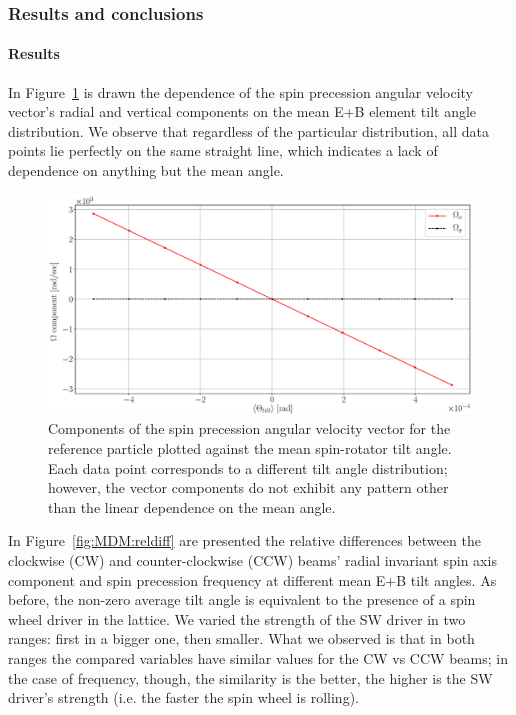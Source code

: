 \documentclass[preprint, review]{elsarticle}
\begin{document}
\subsubsection{Results and conclusions}
\paragraph{Results}
In Figure~\ref{fig:MDM:linearity} is drawn the dependence of the spin precession angular velocity vector's
radial and vertical components on the mean E+B element tilt angle distribution. We observe that
regardless of the particular distribution, all data points lie perfectly on the same straight line,
which indicates a lack of dependence on anything but the mean angle.

\begin{figure}[h]\centering
  \includegraphics[width=\linewidth]{img/fake_signal/linearity_test_shifting_gauss_freq.eps}
  \caption{Components of the spin precession angular velocity vector for the reference particle
      plotted against the mean spin-rotator tilt angle.
      Each data point corresponds to a different tilt angle distribution; however,
      the vector components do not exhibit any pattern other than the linear
      dependence on the mean angle.\label{fig:MDM:linearity}}
\end{figure}

In Figure~\ref{fig:MDM:reldiff} are presented the relative differences between the clockwise (CW) and
counter-clockwise (CCW) beams' radial invariant spin axis component and spin precession frequency at different
mean E+B tilt angles. As before, the non-zero average tilt angle is equivalent to the presence of
a spin wheel driver in the lattice. We varied the strength of the SW driver in two ranges: first in
a bigger one, then smaller. What we observed is that in both ranges the compared variables have similar
values for the CW vs CCW beams; in the case of frequency, though, the similarity is the better, the higher is
the SW driver's strength (i.e. the faster the spin wheel is rolling).
\end{document}
